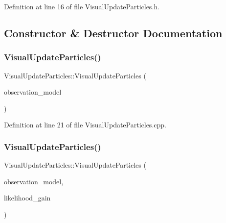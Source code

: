 Definition at line 16 of file Visual\+Update\+Particles.\+h.



\subsection{Constructor \& Destructor Documentation}
\mbox{\label{classVisualUpdateParticles_aa67179b62e91f386402d176975151d48}} 
\subsubsection{\texorpdfstring{Visual\+Update\+Particles()}{VisualUpdateParticles()}\hspace{0.1cm}{\footnotesize\ttfamily [1/3]}}
{\footnotesize\ttfamily Visual\+Update\+Particles\+::\+Visual\+Update\+Particles (\begin{DoxyParamCaption}\item[{std\+::unique\+\_\+ptr$<$ \hyperlink{classVisualProprioception}{Visual\+Proprioception} $>$}]{observation\+\_\+model }\end{DoxyParamCaption})\hspace{0.3cm}{\ttfamily [noexcept]}}



Definition at line 21 of file Visual\+Update\+Particles.\+cpp.

\mbox{\label{classVisualUpdateParticles_ade399f29a375d20c3c707dbab2fb23bb}} 
\subsubsection{\texorpdfstring{Visual\+Update\+Particles()}{VisualUpdateParticles()}\hspace{0.1cm}{\footnotesize\ttfamily [2/3]}}
{\footnotesize\ttfamily Visual\+Update\+Particles\+::\+Visual\+Update\+Particles (\begin{DoxyParamCaption}\item[{std\+::unique\+\_\+ptr$<$ \hyperlink{classVisualProprioception}{Visual\+Proprioception} $>$}]{observation\+\_\+model,  }\item[{const double}]{likelihood\+\_\+gain }\end{DoxyParamCaption})\hspace{0.3cm}{\ttfamily [noexcept]}}



